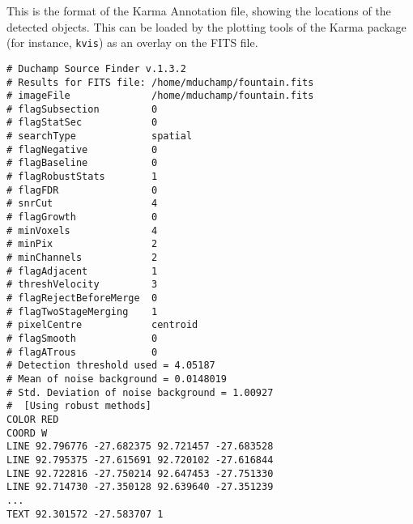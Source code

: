 %
%
%
%
\label{app-karma}

This is the format of the Karma Annotation file, showing the locations
of the detected objects. This can be loaded by the plotting tools of
the Karma package (for instance, \texttt{kvis}) as an overlay on the FITS
file.

\begin{verbatim}
# Duchamp Source Finder v.1.3.2
# Results for FITS file: /home/mduchamp/fountain.fits
# imageFile              /home/mduchamp/fountain.fits
# flagSubsection         0
# flagStatSec            0
# searchType             spatial
# flagNegative           0
# flagBaseline           0
# flagRobustStats        1
# flagFDR                0
# snrCut                 4
# flagGrowth             0
# minVoxels              4
# minPix                 2
# minChannels            2
# flagAdjacent           1
# threshVelocity         3
# flagRejectBeforeMerge  0
# flagTwoStageMerging    1
# pixelCentre            centroid
# flagSmooth             0
# flagATrous             0
# Detection threshold used = 4.05187
# Mean of noise background = 0.0148019
# Std. Deviation of noise background = 1.00927
#  [Using robust methods]
COLOR RED
COORD W
LINE 92.796776 -27.682375 92.721457 -27.683528
LINE 92.795375 -27.615691 92.720102 -27.616844
LINE 92.722816 -27.750214 92.647453 -27.751330
LINE 92.714730 -27.350128 92.639640 -27.351239
...
TEXT 92.301572 -27.583707 1
\end{verbatim}

